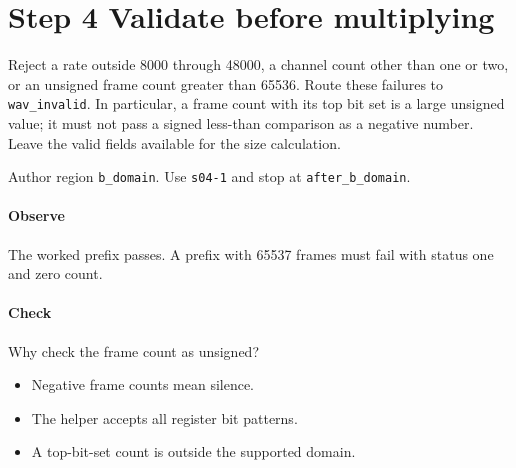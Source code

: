 \section{Step 4 Validate before multiplying}\label{pcm-wav-s04}
Reject a rate outside 8000 through 48000, a channel count other than one or two, or an unsigned frame count greater than 65536. Route these failures to \texttt{wav\_invalid}. In particular, a frame count with its top bit set is a large unsigned value; it must not pass a signed less-than comparison as a negative number. Leave the valid fields available for the size calculation.

Author region \texttt{b\_domain}. Use \texttt{s04-1} and stop at \texttt{after\_b\_domain}.

\paragraph{Observe} The worked prefix passes. A prefix with 65537 frames must fail with status one and zero count.

\paragraph{Check} Why check the frame count as unsigned?
\begin{itemize}
  \item[A.] Negative frame counts mean silence.
  \item[B.] The helper accepts all register bit patterns.
  \item[C.] A top-bit-set count is outside the supported domain.
\end{itemize}
